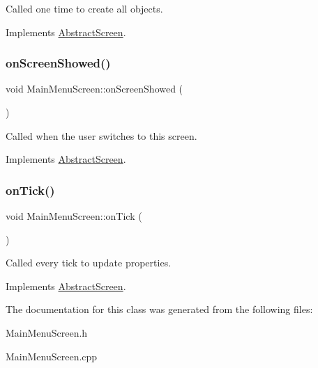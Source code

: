 Called one time to create all objects. 



Implements \mbox{\hyperlink{class_abstract_screen_a7ab389bd33f4824d3d353b5a9e1616de}{Abstract\+Screen}}.

\mbox{\label{class_main_menu_screen_a484fb745ff8ad64b2533ff31f38c7a0c}} 
\subsubsection{\texorpdfstring{on\+Screen\+Showed()}{onScreenShowed()}}
{\footnotesize\ttfamily void Main\+Menu\+Screen\+::on\+Screen\+Showed (\begin{DoxyParamCaption}{ }\end{DoxyParamCaption})\hspace{0.3cm}{\ttfamily [virtual]}}



Called when the user switches to this screen. 



Implements \mbox{\hyperlink{class_abstract_screen_a219687a34e6aed15a9eaf0d4414d1783}{Abstract\+Screen}}.

\mbox{\label{class_main_menu_screen_aed1487c5d901c0a94ff960681f141024}} 
\subsubsection{\texorpdfstring{on\+Tick()}{onTick()}}
{\footnotesize\ttfamily void Main\+Menu\+Screen\+::on\+Tick (\begin{DoxyParamCaption}{ }\end{DoxyParamCaption})\hspace{0.3cm}{\ttfamily [virtual]}}



Called every tick to update properties. 



Implements \mbox{\hyperlink{class_abstract_screen_a3861213630fd23d4a3ff392191614ec2}{Abstract\+Screen}}.



The documentation for this class was generated from the following files\+:\begin{DoxyCompactItemize}
\item 
Main\+Menu\+Screen.\+h\item 
Main\+Menu\+Screen.\+cpp\end{DoxyCompactItemize}
